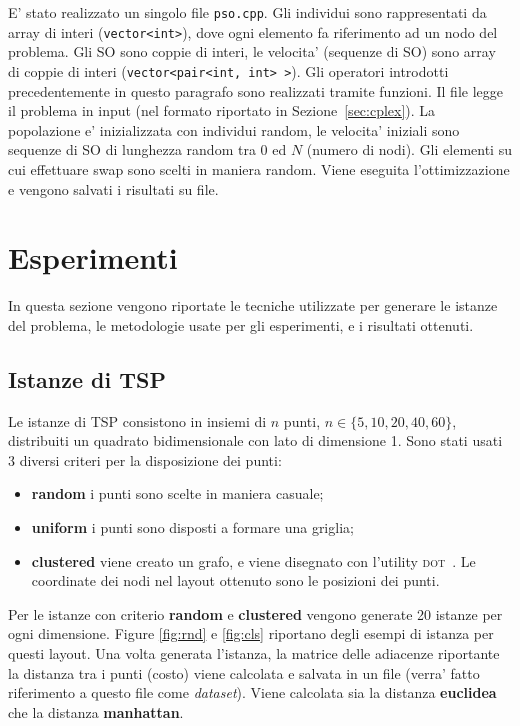 \documentclass[
12pt, %
a4paper, %
oneside, %
headinclude,footinclude, %
BCOR5mm, %
]{scrartcl}
\begin{document}
E' stato realizzato un singolo file \texttt{pso.cpp}. Gli individui sono rappresentati da array di interi (\texttt{vector<int>}), dove ogni elemento fa riferimento ad un nodo del problema. Gli SO sono coppie di interi, le velocita' (sequenze di SO) sono array di coppie di interi (\texttt{vector<pair<int, int> >}). Gli operatori introdotti precedentemente in questo paragrafo sono realizzati tramite funzioni. Il file legge il problema in input (nel formato riportato in Sezione~\ref{sec:cplex}). La popolazione e' inizializzata con individui random, le velocita' iniziali sono sequenze di SO di lunghezza random tra 0 ed $N$ (numero di nodi). Gli elementi su cui effettuare swap sono scelti in maniera random. Viene eseguita l'ottimizzazione e vengono salvati i risultati su file.

\section{Esperimenti}\label{sec:exp}
In questa sezione vengono riportate le tecniche utilizzate per generare le istanze del problema, le metodologie usate per gli esperimenti, e i risultati ottenuti.

\subsection{Istanze di TSP}
Le istanze di TSP consistono in insiemi di $n$ punti, $n \in \{5, 10, 20, 40, 60\}$, distribuiti un quadrato bidimensionale con lato di dimensione 1. Sono stati usati 3 diversi criteri per la disposizione dei punti:
\begin{itemize}
	\item \textbf{random} i punti sono scelte in maniera casuale;
	\item \textbf{uniform} i punti sono disposti a formare una griglia;
	\item \textbf{clustered} viene creato un grafo, e viene disegnato con l'utility \textsc{dot}~\cite{gansner2006drawing}. Le coordinate dei nodi nel layout ottenuto sono le posizioni dei punti.
\end{itemize}
Per le istanze con criterio \textbf{random} e \textbf{clustered} vengono generate 20 istanze per ogni dimensione. Figure \ref{fig:rnd} e \ref{fig:cls} riportano degli esempi di istanza per questi layout. Una volta generata l'istanza, la matrice delle adiacenze riportante la distanza tra i punti (costo) viene calcolata e salvata in un file (verra' fatto riferimento a questo file come \textit{dataset}). Viene calcolata sia la distanza \textbf{euclidea} che la distanza \textbf{manhattan}.
\end{document}
